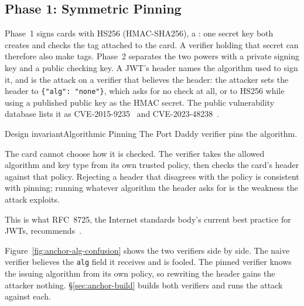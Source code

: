 \documentclass[11pt,a4paper]{article}
\theoremstyle{definition}
\begin{document}


\subsection{Phase 1: Symmetric Pinning}

Phase~1 signs cards with HS256 (HMAC-SHA256), a
: one secret key both creates and checks the tag attached to the card. A
verifier holding that secret can therefore also make tags. Phase~2 separates
the two powers with a private signing key and a public checking key. A JWT's header names the algorithm used to sign it, and  is the attack on a verifier that believes the header: the attacker sets the header to \texttt{\{"alg": "none"\}}, which asks for no check at all, or to HS256 while using a published public key as the HMAC secret. The public vulnerability database lists it as CVE-2015-9235~ and CVE-2023-48238~.

\ifdefined\pdswisslandmarkplate
\begin{figure}[p]
  \centering
\end{figure}
\pdmarginpagebreak
\fi

\begin{pdclaim}{Design invariant}{Algorithmic Pinning}
\setlength{\parskip}{4pt plus 1pt}
\label{prop:alg-pinning}
The Port Daddy verifier pins the algorithm.

The card cannot choose how it is checked. The verifier takes the allowed
algorithm and key type from its own trusted policy, then checks the card's
header against that policy. Rejecting a header that disagrees with the policy
is consistent with pinning; running whatever algorithm the header asks for is
the weakness the attack exploits.

This is what RFC~8725, the Internet standards body's current best practice for JWTs, recommends~.
\end{pdclaim}

Figure~\ref{fig:anchor-alg-confusion} shows the two verifiers side by side. The naive verifier believes the \texttt{alg} field it receives and is fooled. The pinned verifier knows the issuing algorithm from its own policy, so rewriting the header gains the attacker nothing. \S\ref{sec:anchor-build} builds both verifiers and runs the attack against each.


\end{document}
